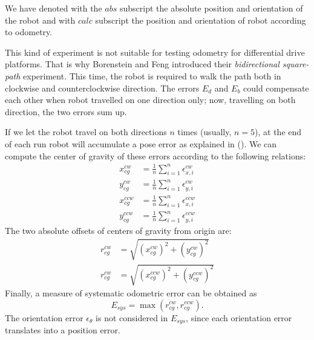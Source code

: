 \documentclass[a4paper, onecolumn]{report}
\begin{document}
We have denoted with the $abs$ subscript the absolute position and orientation of the robot and with $calc$ subscript the position and orientation of robot according to odometry.

This kind of experiment is not suitable for testing odometry for differential drive platforms. That is why Borenstein and Feng introduced their \emph{bidirectional square-path} experiment. This time, the robot is required to walk the path both in clockwise and counterclockwise direction. The errors $E_d$ and $E_b$ could compensate each other when robot travelled on one direction only; now, travelling on both direction, the two errors sum up.

If we let the robot travel on both directions $n$ times (usually, $n=5$), at the end of each run robot will accumulate a pose error as explained in (). We can compute the center of gravity of these errors according to the following relations:
\begin{equation}
	\begin{aligned}
		x_{cg}^{cw} &= \frac{1}{n}\sum^n_{i=1}\epsilon_{x,i}^{cw} \\
		y_{cg}^{cw} &= \frac{1}{n}\sum^n_{i=1}\epsilon_{y,i}^{cw} \\
		x_{cg}^{ccw} &= \frac{1}{n}\sum^n_{i=1}\epsilon_{x,i}^{ccw} \\
		y_{cg}^{ccw} &= \frac{1}{n}\sum^n_{i=1}\epsilon_{y,i}^{ccw} 
	\end{aligned}
\end{equation}
The two absolute offsets of centers of gravity from origin are:
\begin{equation}
	\begin{aligned}
		r_{cg}^{cw} &= \sqrt{(x_{cg}^{cw})^2+(y_{cg}^{cw})^2} \\
		r_{cg}^{cw} &= \sqrt{(x_{cg}^{ccw})^2+(y_{cg}^{ccw})^2}
	\end{aligned}
\end{equation}
Finally, a measure of systematic odometric error can be obtained as
\begin{equation}
	E_{sys} = \max(r_{cg}^{cw},r_{cg}^{ccw}).
\end{equation}
The orientation error $\epsilon_\theta$ is not considered in $E_{sys}$, since each orientation error translates into a position error.
\end{document}
